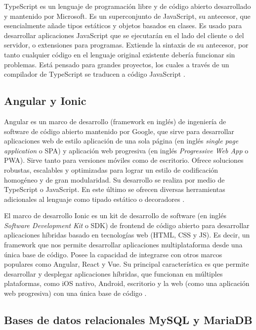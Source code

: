 TypeScript es un lenguaje de programación libre y de código abierto desarrollado y mantenido por Microsoft. Es un superconjunto de JavaScript, su antecesor, que esencialmente añade tipos estáticos y objetos basados en clases. Es usado para desarrollar aplicaciones JavaScript que se ejecutarán en el lado del cliente o del servidor, o extensiones para programas. Extiende la sintaxis de su antecesor, por tanto cualquier código en el lenguaje original existente debería funcionar sin problemas. Está pensado para grandes proyectos, los cuales a través de un compilador de TypeScript se traducen a código JavaScript \citep{17}.

\subsection{Angular y Ionic}

Angular es un marco de desarrollo (framework en inglés) de ingeniería de software de código abierto mantenido por Google, que sirve para desarrollar aplicaciones web de estilo aplicación de una sola página (en inglés \textit{single page application} o SPA) y aplicación web progresiva (en inglés \textit{Progressive Web App} o PWA). Sirve tanto para versiones móviles como de escritorio. Ofrece soluciones robustas, escalables y optimizadas para lograr un estilo de codificación homogéneo y de gran modularidad. Su desarrollo se realiza por medio de TypeScript o JavaScript. En este último se ofrecen diversas herramientas adicionales al lenguaje como tipado estático o decoradores \citep{18}.

El marco de desarrollo Ionic es un kit de desarrollo de software (en inglés \textit{Software Development Kit} o SDK) de frontend de código abierto para desarrollar aplicaciones híbridas basado en tecnologías web (HTML, CSS y JS). Es decir, un framework que nos permite desarrollar aplicaciones multiplataforma desde una única base de código. Posee la capacidad de integrarse con otros marcos populares como Angular, React y Vue. Su principal característica es que permite desarrollar y desplegar aplicaciones híbridas, que funcionan en múltiples plataformas, como iOS nativo, Android, escritorio y la web (como una aplicación web progresiva) con una única base de código \citep{19}.

\subsection{Bases de datos relacionales MySQL y MariaDB}

